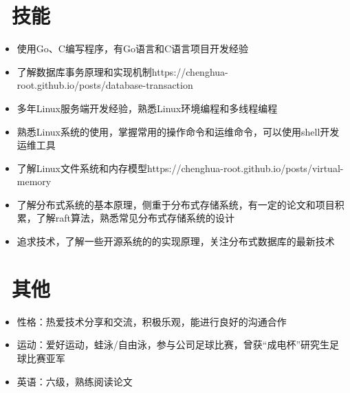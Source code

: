 \documentclass{resume}
\begin{document}
\section{\faCogs\  技能}
\begin{itemize}[parsep=0.5ex]
  \item 使用Go、C编写程序，有Go语言和C语言项目开发经验
  \item 了解数据库事务原理和实现机制https://chenghua-root.github.io/posts/database-transaction
  \item 多年Linux服务端开发经验，熟悉Linux环境编程和多线程编程
  \item 熟悉Linux系统的使用，掌握常用的操作命令和运维命令，可以使用shell开发运维工具
  \item 了解Linux文件系统和内存模型https://chenghua-root.github.io/posts/virtual-memory
  \item 了解分布式系统的基本原理，侧重于分布式存储系统，有一定的论文和项目积累，了解raft算法，熟悉常见分布式存储系统的设计
  \item 追求技术，了解一些开源系统的的实现原理，关注分布式数据库的最新技术
\end{itemize}

\section{\faInfo\  其他}
\begin{itemize}[parsep=0.5ex]
  \item 性格：热爱技术分享和交流，积极乐观，能进行良好的沟通合作
  \item 运动：爱好运动，蛙泳/自由泳，参与公司足球比赛，曾获“成电杯”研究生足球比赛亚军
  \item 英语：六级，熟练阅读论文
\end{itemize}

%
%
\end{document}
